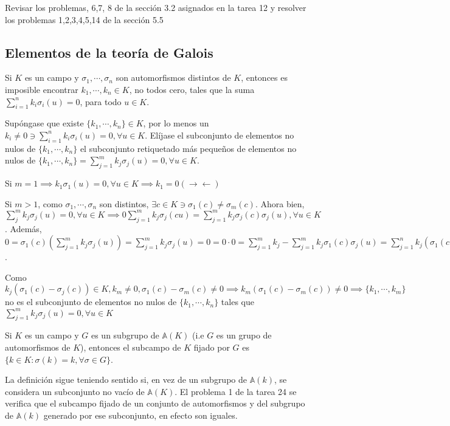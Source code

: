 \begin{cajita}
    Revisar los problemas, 6,7, 8 de la sección 3.2 asignados en la tarea 12 y resolver los problemas 1,2,3,4,5,14 de la sección 5.5
\end{cajita}

\subsection{Elementos de la teoría de Galois}

\begin{teorema}[5L]
    Si $K$ es un campo y $\sigma_1,\cdots, \sigma_n$ son automorfismos distintos de $K$, entonces es imposible encontrar $k_1,\cdots, k_n\in K$, no todos cero, tales que la suma $\sum_{i=1}^n k_i\sigma_i(u)=0$, para todo $u\in K$. 
    \begin{dem}
        Supóngase que existe $\{k_1,\cdots,k_n\}\in K$, por lo menos un $k_i\neq 0\ni \sum_{i=1}^n k_i\sigma_i(u)=0,\forall u\in K$. Elíjase el subconjunto de elementos no nulos de $\{k_1,\cdots, k_n\}$ el subconjunto retiquetado más pequeños de elementos no nulos de $\{k_1,\cdots,k_n\}=\sum_{j=1}^m k_j\sigma_j(u)=0,\forall u\in K$.

        Si $m=1\implies k_1\sigma_1(u)=0,\forall u\in K\implies k_1=0(\to\gets)$

        Si $m>1$, como $\sigma_1,\cdots, \sigma_n$ son distintos, $\exists c\in K\ni \sigma_1(c)\neq \sigma_m(c)$. Ahora bien, $\sum_{j}^m k_j\sigma_j(u)=0,\forall u\in K\implies 0\sum_{j=1}^m k_j\sigma_j(cu)=\sum_{j=1}^m k_j \sigma_j(c)\sigma_j(u),\forall u\in K$. Además, $0=\sigma_1(c)\left(\sum_{j=1}^m k_j \sigma_j(u)\right) = \sum_{j=1}^m k_j \sigma_j(u)=0=0\cdot 0=\sum_{j=1}^m k_j -\sum_{j=1}^mk_j\sigma_1(c)\sigma_j(u)=\sum_{j=1}^n k_j(\sigma_1(c)-\sigma_j(c))\sigma_j(u)=\sum_{j=2}^m k_j(\sigma_1(c)-\sigma_j(c))\sigma(u)$. 

        Como $k_j(\sigma_1(c)-\sigma_j(c))\in K,k_m\neq 0, \sigma_1(c)-\sigma_m(c)\neq 0\implies k_m(\sigma_1(c)-\sigma_m(c))\neq 0\implies \{k_1,\cdots,k_m\}$ no es el subconjunto de elementos no nulos de $\{k_1,\cdots,k_n\}$ tales que $\sum_{j=1}^m k_j \sigma_j(u)=0,\forall u\in K$
        \begin{definicion}
            Si $K$ es un campo y $G$ es un subgrupo de $\mathbb{A}(K)$ (i.e $G$ es un grupo de automorfismos de $K$), entonces el subcampo de $K$ fijado por $G$ es $\{k\in K:\sigma(k)=k,\forall \sigma\in G\}$.
            \begin{nota}
                La definición sigue teniendo sentido si, en vez de un subgrupo de $\mathbb{A}(k)$, se considera un subconjunto no vacío de $\mathbb{A}(K)$. El problema 1 de la tarea 24 se verifica que el subcampo fijado de un conjunto de automorfismos y del subgrupo de $\mathbb{A}(k)$ generado por ese subconjunto, en efecto son iguales. 
            \end{nota}
        \end{definicion}
    \end{dem}
\end{teorema}


